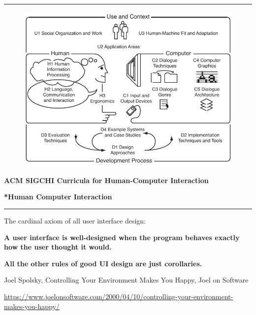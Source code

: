 \documentclass[pdf]{beamer}
\begin{document}
{{{{{{{\begin{frame}
\textcolor{red}{\rule{10cm}{1mm}}

\begin{figure}
\includegraphics[scale=0.7, center]{figure_1.pdf}
\end{figure}

\textbf{ACM SIGCHI Curricula for Human-Computer Interaction}

\end{frame}



{
\begin{frame}
\vspace{8mm}
\textcolor{myBlue}{\textbf{\Large{*Human Computer Interaction}}}

\textcolor{red}{\rule{10cm}{1mm}}

The cardinal axiom of all user interface design:
\newline 

\textbf{A user interface is well-designed when the program behaves exactly how the user thought it would.}
\newline

\textbf{All the other rules of good UI design are just corollaries.}
\newline

Joel Spolsky, Controlling Your Environment Makes You Happy, Joel on Software

\url{https://www.joelonsoftware.com/2000/04/10/controlling-your-environment-makes-you-happy/}
\end{frame}}



}}}}}}}
\end{document}
